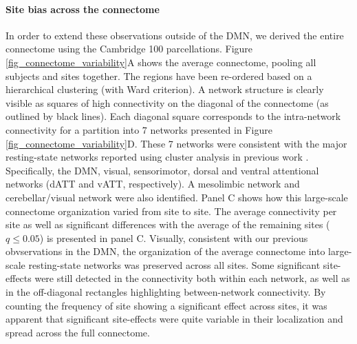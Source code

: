 \documentclass[authoryear]{elsarticle}
\begin{document}
\paragraph{Site bias across the connectome} In order to extend these observations outside of the DMN, we derived the entire connectome using the Cambridge 100 parcellations. Figure \ref{fig_connectome_variability}A shows the average connectome, pooling all subjects and sites together. The regions have been re-ordered based on a hierarchical clustering (with Ward criterion). A network structure is clearly visible as squares of high connectivity on the diagonal of the connectome (as outlined by black lines). Each diagonal square corresponds to the intra-network connectivity for a partition into 7 networks presented in Figure \ref{fig_connectome_variability}D. These 7 networks were consistent with the major resting-state networks reported using cluster analysis in previous work \citep[e.g.][]{Heuvel2008, Bellec2010, Yeo2011, Power2011}. Specifically, the DMN, visual, sensorimotor, dorsal and ventral attentional networks (dATT and vATT, respectively). A mesolimbic network and cerebellar/visual network were also identified. Panel C shows how this large-scale connectome organization varied from site to site. The average connectivity per site as well as significant differences with the average of the remaining sites ($q\leq 0.05$) is presented in panel C. Visually, consistent with our previous obvservations in the DMN, the organization of the average connectome into large-scale resting-state networks was preserved across all sites. Some significant site-effects were still detected in the connectivity both within each network, as well as in the off-diagonal rectangles highlighting between-network connectivity. By counting the frequency of site showing a significant effect across sites, it was apparent that significant site-effects were quite variable in their localization and spread across the full connectome. 
\end{document}
